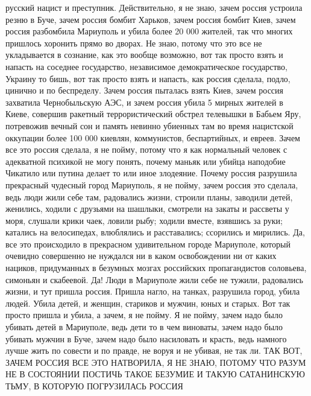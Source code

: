 русский нацист и преступник. Действительно, я не знаю, зачем
россия устроила резню в Буче, зачем россия бомбит Харьков, зачем россия бомбит
Киев, зачем россия разбомбила Мариуполь и убила более 20 000 жителей, так что
многих пришлось хоронить прямо во дворах. Не знаю, потому что это все не
укладывается в сознание, как это вообще возможно, вот так просто взять и
напасть на соседнее государство, независимое демократическое государство,
Украину то бишь, вот так просто взять и напасть, как россия сделала, подло,
цинично и по беспределу.  Зачем россия пыталась взять Киев, зачем россия
захватила Чернобыльскую АЭС, и зачем россия убила 5 мирных жителей в Киеве,
совершив ракетный террористический обстрел телевышки в Бабьем Яру, потревожив
вечный сон и память невинно убиенных там во время нацистской оккупации более
100 000 киевлян, коммунистов, беспартийных, и евреев. Зачем все это россия
сделала, я не пойму, потому что я как нормальный человек с адекватной психикой
не могу понять, почему маньяк или убийца наподобие Чикатило или путина делает
то или иное злодеяние.  Почему россия разрушила прекрасный чудесный город
Мариуполь, я не пойму, зачем россия это сделала, ведь люди жили себе там,
радовались жизни, строили планы, заводили детей, женились, ходили с друзьями на
шашлыки, смотрели на закаты и рассветы у моря, слушали крики чаек, ловили рыбу;
ходили вместе, взявшись за руки; катались на велосипедах, влюблялись и
расставались; ссорились и мирились. Да, все это происходило в прекрасном
удивительном городе Мариуполе, который очевидно совершенно не нуждался ни в
каком освобождении ни от каких нациков, придуманных в безумных мозгах
российских пропагандистов соловьева, симоньян и скабеевой. Да! Люди в Мариуполе
жили себе не тужили, радовались жизни, и тут пришла россия. Пришла нагло, на
танках, разрушила город, убила людей. Убила детей, и женщин, стариков и мужчин,
юных и старых. Вот так просто пришла и убила, а зачем, я не пойму. Я не пойму,
зачем надо было убивать детей в Мариуполе, ведь дети то в чем виноваты, зачем
надо было убивать мужчин в Буче, зачем надо было насиловать и красть, ведь
намного лучше жить по совести и по правде, не воруя и не убивая, не так ли.
ТАК ВОТ, ЗАЧЕМ РОССИЯ ВСЕ ЭТО НАТВОРИЛА, Я НЕ ЗНАЮ, ПОТОМУ ЧТО РАЗУМ НЕ В
СОСТОЯНИИ ПОСТИЧЬ ТАКОЕ БЕЗУМИЕ И ТАКУЮ САТАНИНСКУЮ ТЬМУ, В КОТОРУЮ ПОГРУЗИЛАСЬ
РОССИЯ


